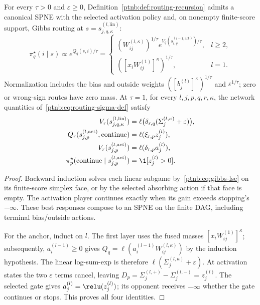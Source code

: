 \begin{theoremenv}\label{ptnb:thm:routing-forward}
For every $\tau>0$ and $\varepsilon\geq0$, Definition~\ref{ptnb:def:routing-recursion} admits a canonical SPNE with the selected activation policy and, on nonempty finite-score support, Gibbs routing at $s=s_{j,q,\kappa}^{(l,\mathrm{lin})}$:
\begin{equation}\label{ptnb:eq:routing-spne-linear}
 \pi_q^\star(i\mid s)\propto e^{Q_q(s,i)/\tau}
 =\begin{cases}
 (W_{ij}^{(l,\kappa)})^{1/\tau}e^{V_q(s_{i,q}^{(l-1,\mathrm{act})})/\tau},&l\geq2,\\
 ([x_iW_{ij}^{(1)}]^\kappa)^{1/\tau},&l=1.
 \end{cases}
\end{equation}
Normalization includes the bias and outside weights $([b_j^{(l)}]^\kappa)^{1/\tau}$ and $\varepsilon^{1/\tau}$; zero or wrong-sign routes have zero mass. At $\tau=1$, for every $l,j,p,q,r,\kappa$, the network quantities of~\eqref{ptnb:eq:routing-sigma-def} satisfy
\begin{align}
 V_r(s_{j,q,\kappa}^{(l,\mathrm{lin})})&=\ell\bigl(\delta_{r,q}(\Sigma_j^{(l,\kappa)}+\varepsilon)\bigr),\label{ptnb:eq:routing-forward-linear}\\
 Q_r(s_{j,p}^{(l,\mathrm{act})},\mathrm{continue})&=\ell(\xi_{r,p}z_j^{(l)}),\label{ptnb:eq:routing-forward-continue}\\
 V_r(s_{j,p}^{(l,\mathrm{act})})&=\ell(\delta_{r,p}a_j^{(l)}),\label{ptnb:eq:routing-forward-act}\\
 \pi_p^\star(\mathrm{continue}\mid s_{j,p}^{(l,\mathrm{act})})&=\1[z_j^{(l)}>0].\label{ptnb:eq:routing-forward-stop}
\end{align}
\end{theoremenv}
\begin{proof}
Backward induction solves each linear subgame by~\eqref{ptnb:eq:gibbs-lse} on its finite-score simplex face, or by the selected absorbing action if that face is empty. The activation player continues exactly when its gain exceeds stopping's $-\infty$. These best responses compose to an SPNE on the finite DAG, including terminal bias/outside actions.

For the anchor, induct on $l$. The first layer uses the fused masses $[x_iW_{ij}^{(1)}]^\kappa$; subsequently, $a_i^{(l-1)}\geq0$ gives $Q_q=\ell(a_i^{(l-1)}W_{ij}^{(l,\kappa)})$ by the induction hypothesis. The linear log-sum-exp is therefore $\ell(\Sigma_j^{(l,\kappa)}+\varepsilon)$. At activation states the two $\varepsilon$ terms cancel, leaving $D_p=\Sigma_j^{(l,+)}-\Sigma_j^{(l,-)}=z_j^{(l)}$. The selected gate gives $a_j^{(l)}=\relu(z_j^{(l)})$; its opponent receives $-\infty$ whether the gate continues or stops. This proves all four identities.
\end{proof}

